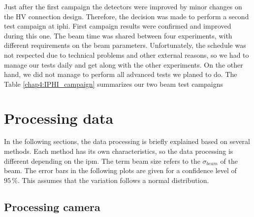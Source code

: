 \begin{refsection}
  

  Just after the first campaign the detectors were improved by minor changes on the HV connection design. Therefore, the decision was made to perform a second test campaign at \acrshort{iphi}.
  First campaign results were confirmed and improved during this one.
  The beam time was shared between four experiments, with different requirements on the beam parameters.
  Unfortunately, the schedule was not respected due to technical problems and other external reasons, so
  we had to manage our tests daily and get along with the other experiments.
  On the other hand, we did not manage to perform all advanced tests we planed to do.
  The Table \ref{chap4:IPHI_campaign} summarizes our two beam test campaigns

  


  \section{Processing data}
  In the following sections, the data processing is briefly explained based on several methods. Each method has its own characteristics, so the data processing is different depending on the \acrshort{ipm}. The term beam size refers to the $\sigma_{beam}$ of the beam. The error bars in the following plots are given for a confidence level of $95\,\mathrm{\%}$. This assumes that the variation follows a normal distribution.

  \subsection{Processing camera}


\end{refsection}
